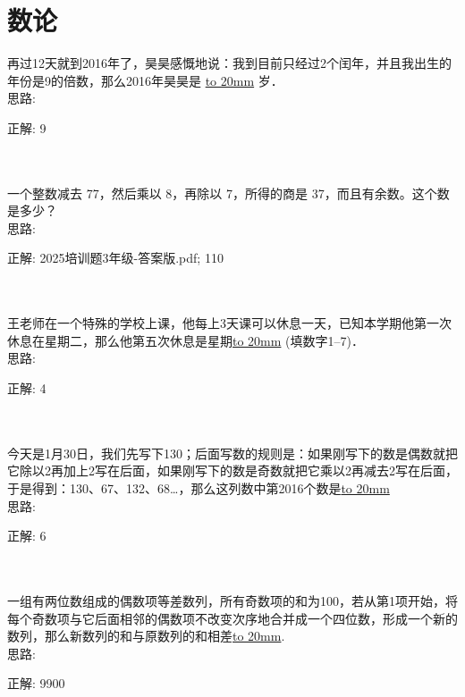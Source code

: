 \section{数论}

\item {
    再过12天就到2016年了，昊昊感慨地说：我到目前只经过2个闰年，并且我出生的年份是9的倍数，那么2016年昊昊是 \underline{\hbox to 20mm{}} 岁． 
    \ifshowSolution
        \fangsong{}
        \\
        思路:

        正解: 9 
    \else
        \\ \\ \\
    \fi
}

\item {
    一个整数减去 77，然后乘以 8，再除以 7，所得的商是 37，而且有余数。这个数是多少？
    \ifshowSolution
        \fangsong{}
        \\
        思路:

        正解: 2025培训题3年级-答案版.pdf; 110
    \else
        \\ \\ \\
    \fi
}

\item {
    王老师在一个特殊的学校上课，他每上3天课可以休息一天，已知本学期他第一次休息在星期二，那么他第五次休息是星期\underline{\hbox to 20mm{}} (填数字1--7)．
    \ifshowSolution
        \fangsong{}
        \\
        思路:

        正解: 4
    \else
        \\ \\ \\
    \fi
}

\item {
    今天是1月30日，我们先写下130；后面写数的规则是：如果刚写下的数是偶数就把它除以2再加上2写在后面，如果刚写下的数是奇数就把它乘以2再减去2写在后面，于是得到：130、67、132、68…，那么这列数中第2016个数是\underline{\hbox to 20mm{}}
    \ifshowSolution
        \fangsong{}
        \\
        思路:

        正解:  6
    \else
        \\ \\ \\
    \fi
}

\item {
    一组有两位数组成的偶数项等差数列，所有奇数项的和为100，若从第1项开始，将每个奇数项与它后面相邻的偶数项不改变次序地合并成一个四位数，形成一个新的数列，那么新数列的和与原数列的和相差\underline{\hbox to 20mm{}}.
    \ifshowSolution
        \fangsong{}
        \\
        思路:

        正解: 9900
    \else
        \\ \\ \\
    \fi
}

